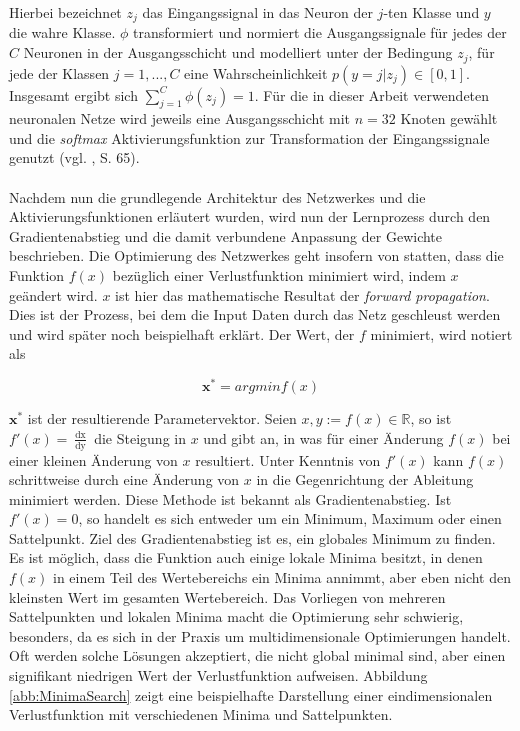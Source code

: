 \documentclass[a4paper,11pt]{article}
\begin{document}
Hierbei bezeichnet $z_j$ das Eingangssignal in das Neuron der $j$-ten Klasse und $y$ die wahre Klasse. $\phi$ transformiert und normiert die Ausgangssignale für jedes der $C$ Neuronen in der Ausgangsschicht und modelliert unter der Bedingung $z_j$, für jede der Klassen $j = 1,..., C$ eine Wahrscheinlichkeit $p(y=j|z_j) \in \left[0, 1\right]$. Insgesamt ergibt sich $\sum_{j = 1}^C \phi(z_j) = 1$. Für die in dieser Arbeit verwendeten neuronalen Netze wird jeweils eine Ausgangsschicht mit $n = 32$ Knoten gewählt und die \textit{softmax} Aktivierungsfunktion zur Transformation der Eingangssignale genutzt (vgl. \cite{deepEssentials}, S. 65).\\
\\
Nachdem nun die grundlegende Architektur des Netzwerkes und die Aktivierungsfunktionen erläutert wurden, wird nun der Lernprozess durch den Gradientenabstieg und die damit verbundene Anpassung der Gewichte beschrieben. Die Optimierung des Netzwerkes geht insofern von statten, dass die Funktion $f(x)$ bezüglich einer Verlustfunktion minimiert wird, indem $x$ geändert wird. $x$ ist hier das mathematische Resultat der \textit{forward propagation}. Dies ist der Prozess, bei dem die Input Daten durch das Netz geschleust werden und wird später noch beispielhaft erklärt.
Der Wert, der $f$ minimiert, wird notiert als 

\[\bm{x}^\ast = argmin f(x)\]

$\bm{x}^\ast$ ist der resultierende Parametervektor.
Seien $x, y := f(x) \in \mathbb{R}$, so ist $f'(x) = \frac{\mathop{dx}}{\mathop{dy}}$ die Steigung in $x$ und gibt an, in was für einer Änderung $f(x)$ bei einer kleinen Änderung von $x$ resultiert. Unter Kenntnis von $f'(x)$ kann $f(x)$ schrittweise durch eine Änderung von $x$ in die Gegenrichtung der Ableitung minimiert werden. Diese Methode ist bekannt als Gradientenabstieg. Ist $f'(x) = 0$, so handelt es sich entweder um ein Minimum, Maximum oder einen Sattelpunkt. Ziel des Gradientenabstieg ist es, ein globales Minimum zu finden. Es ist möglich, dass die Funktion auch einige lokale Minima besitzt, in denen $f(x)$ in einem Teil des Wertebereichs ein Minima annimmt, aber eben nicht den kleinsten Wert im gesamten Wertebereich. Das Vorliegen von mehreren Sattelpunkten und lokalen Minima macht die Optimierung sehr schwierig, besonders, da es sich in der Praxis um multidimensionale Optimierungen handelt. Oft werden solche Lösungen akzeptiert, die nicht global minimal sind, aber einen signifikant niedrigen Wert der Verlustfunktion aufweisen. Abbildung \ref{abb:MinimaSearch} zeigt eine beispielhafte Darstellung einer eindimensionalen Verlustfunktion mit verschiedenen Minima und Sattelpunkten.
\end{document}
